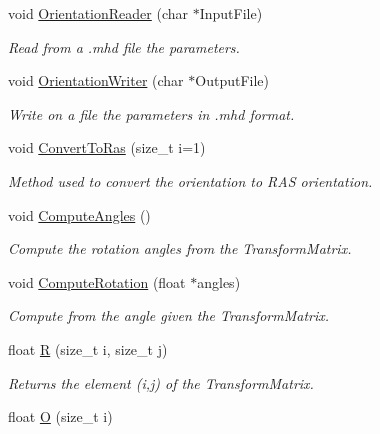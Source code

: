 \begin{DoxyCompactItemize}
\item 
void \hyperlink{classMhd_1_1MhdPythonOrientation_a7b416c1cd0f1ce25a5f9528c09b1627f}{\-Orientation\-Reader} (char $\ast$\-Input\-File)
\begin{DoxyCompactList}\small\item\em \-Read from a .mhd file the parameters. \end{DoxyCompactList}\item 
void \hyperlink{classMhd_1_1MhdPythonOrientation_ad6f7afb1a8037e25b1fc75ff9f69482c}{\-Orientation\-Writer} (char $\ast$\-Output\-File)
\begin{DoxyCompactList}\small\item\em \-Write on a file the parameters in .mhd format. \end{DoxyCompactList}\item 
void \hyperlink{classMhd_1_1MhdPythonOrientation_a13afc263f356f04c0a4b3fdea100d404}{\-Convert\-To\-Ras} (size\-\_\-t i=1)
\begin{DoxyCompactList}\small\item\em \-Method used to convert the orientation to \-R\-A\-S orientation. \end{DoxyCompactList}\item 
void \hyperlink{classMhd_1_1MhdPythonOrientation_a68aa8ee651b7e2f9b55efdaa32a9312a}{\-Compute\-Angles} ()
\begin{DoxyCompactList}\small\item\em \-Compute the rotation angles from the \-Transform\-Matrix. \end{DoxyCompactList}\item 
void \hyperlink{classMhd_1_1MhdPythonOrientation_a2cba17c77a9f6bf2cbc15f7c579a025e}{\-Compute\-Rotation} (float $\ast$angles)
\begin{DoxyCompactList}\small\item\em \-Compute from the angle given the \-Transform\-Matrix. \end{DoxyCompactList}\item 
float \hyperlink{classMhd_1_1MhdPythonOrientation_aec7c65c9ee80de78e5864f59534b3e70}{\-R} (size\-\_\-t i, size\-\_\-t j)
\begin{DoxyCompactList}\small\item\em \-Returns the element (i,j) of the \-Transform\-Matrix. \end{DoxyCompactList}\item 
float \hyperlink{classMhd_1_1MhdPythonOrientation_a3a7d814f43db6467745b3e8fb560d131}{\-O} (size\-\_\-t i)

\end{DoxyCompactItemize}
